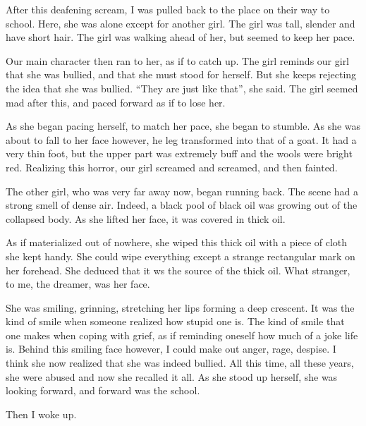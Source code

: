 \documentclass[a4paper,10pt]{article}
\begin{document}
After this deafening scream, I was pulled back to the place on their way to school.
Here, she was alone except for another girl.
The girl was tall, slender and have short hair.
The girl was walking ahead of her, but seemed to keep her pace.

Our main character then ran to her, as if to catch up.
The girl reminds our girl that she was bullied, and that she must stood for herself.
But she keeps rejecting the idea that she was bullied.
``They are just like that'', she said.
The girl seemed mad after this, and paced forward as if to lose her.

As she began pacing herself, to match her pace, she began to stumble.
As she was about to fall to her face however, he leg transformed into that of a goat.
It had a very thin foot, but the upper part was extremely buff and the wools were bright red.
Realizing this horror, our girl screamed and screamed, and then fainted.

The other girl, who was very far away now, began running back.
The scene had a strong smell of dense air.
Indeed, a black pool of black oil was growing out of the collapsed body.
As she lifted her face, it was covered in thick oil.

As if materialized out of nowhere, she wiped this thick oil with a piece of cloth she kept handy.
She could wipe everything except a strange rectangular mark on her forehead.
She deduced that it ws the source of the thick oil.
What stranger, to me, the dreamer, was her face.

She was smiling, grinning, stretching her lips forming a deep crescent.
It was the kind of smile when someone realized how stupid one is.
The kind of smile that one makes when coping with grief, as if reminding oneself how much of a joke life is.
Behind this smiling face however, I could make out anger, rage, despise.
I think she now realized that she was indeed bullied.
All this time, all these years, she were abused and now she recalled it all.
As she stood up herself, she was looking forward, and forward was the school.

Then I woke up.
\end{document}
